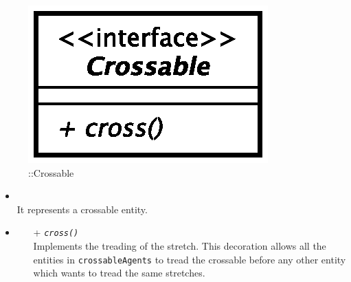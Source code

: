 \begin{figure}[h]
\centering
\includegraphics[scale=0.6,keepaspectratio]{images/solution/app/backend/crossable.eps}
\caption{\pReactiveComponentStretchDecoration::Crossable}
\label{fig:sd-app-crossable}
\end{figure}
\FloatBarrier
\begin{itemize}
  \item \textbf{\descr} \\
    It represents a crossable entity. 
\item \textbf{\ops}
  \begin{itemize}
    \item[+] \texttt{\textit{cross()}} \\
Implements the treading of the stretch. This decoration allows all the
entities in \texttt{crossableAgents} to tread the crossable before any other entity
which wants to tread the same stretches.
  \end{itemize}
\end{itemize}
